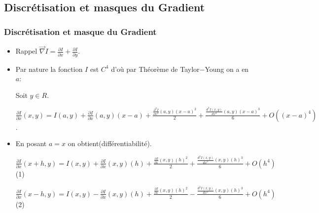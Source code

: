\documentclass{beamer}
\newcommand{\divp}[2]
	{
	  \frac{\partial #1}{\partial #2}
	}
\newcommand{\divpsnd}[2]
	{
	  \frac{\partial^2 #1}{\partial #2^2}
	}
\begin{document}
\subsection{Discrétisation et masques du Gradient}
\begin{frame}
\frametitle{Discrétisation et masque du Gradient}
\begin{itemize}
\item <1->Rappel $\vec{\nabla} I = \divp{I}{x} + \divp{I}{y}$.

\item <1-> Par nature la fonction $I$ est $C^4$ d'où par Théorème de Taylor$-$Young on a en $a$:

Soit $y \in R$.

$\divp{I}{x}(x,y) = I(a,y) + \divp{I}{x}(a,y)(x-a) + \frac{\divpsnd{I}{x}(a,y)(x-a)^2}{2} + \frac{\frac{d^3I(x,y)}{dx^3}(a,y)(x-a)^3}{6} + O((x-a)^4)$.

\item <2-> En posant $a = x$ on obtient(différentiabilité).

$\divp{I}{x}(x+h,y) = I(x,y) + \divp{I}{x}(x,y)(h) + \frac{\divp{I}{x}(x,y)(h)^2}{2} + \frac{\frac{d^3I(x,y)}{dx^3}(x,y)(h)^3}{6} + O(h^4)$ (1)

$\divp{I}{x}(x-h,y) = I(x,y) - \divp{I}{x}(x,y)(h) + \frac{\divp{I}{x}(x,y)(h)^2}{2} - \frac{\frac{d^3I(x,y)}{dx^3}(x,y)(h)^3}{6} + O(h^4)$ (2)
\end{itemize}
\end{frame}
\end{document}
